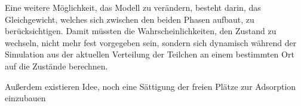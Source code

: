Eine weitere Möglichkeit, das Modell zu verändern, besteht darin, das Gleichgewicht, welches sich zwischen den beiden Phasen aufbaut, zu berücksichtigen. Damit müssten die Wahrscheinlichkeiten, den Zustand zu wechseln, nicht mehr fest vorgegeben sein, sondern sich dynamisch während der Simulation aus der aktuellen Verteilung der Teilchen an einem bestimmten Ort auf die Zustände berechnen.

Außerdem existieren Idee, noch eine Sättigung der freien Plätze zur Adsorption einzubauen


